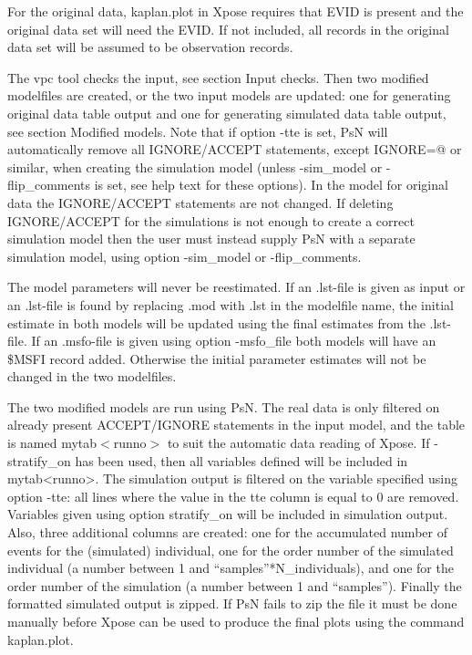 For the original data, kaplan.plot in Xpose requires that EVID is present and the original data set will need the EVID. If not included, all records in the original data set will be assumed to be observation records.

The vpc tool checks the input, see section Input checks. Then two modified modelfiles are created, or the two input models are updated: one for generating original data table output and one for generating simulated data table output, see section Modified models. Note that if option -tte is set, PsN will automatically remove all  IGNORE/ACCEPT statements, except IGNORE=@ or similar,  when creating the simulation model (unless -sim\_model or -flip\_comments is set, see help text for these options). In the model for original data the IGNORE/ACCEPT statements are not changed. If deleting IGNORE/ACCEPT for the simulations is not enough to create a correct simulation model then the user must instead supply PsN with a separate simulation model, using option -sim\_model or -flip\_comments.

The model parameters will never be reestimated. If an .lst-file is given as input or an .lst-file is found by replacing .mod with .lst in the modelfile name, the initial estimate in both models will be updated using the final estimates from the .lst-file. If an .msfo-file is given using option -msfo\_file both models will have an \$MSFI record added. Otherwise the initial parameter estimates will not be changed in the two modelfiles. 

The two modified models are run using PsN. The real data is only filtered on already present ACCEPT/IGNORE statements in the input model, and the table is named mytab$<$runno$>$ to suit the automatic data reading of Xpose. If -stratify\_on has been used, then all variables defined will be included in mytab<runno>. The simulation output is filtered on the variable specified using option -tte: all lines where the value in the tte column is equal to 0 are removed. Variables given using option stratify\_on will be included in simulation output. Also, three additional columns are created: one for the accumulated number of events for the (simulated) individual, one for the order number of the simulated individual (a number between 1 and “samples”*N\_individuals), and one for the order number of the simulation (a number between 1 and “samples”).  Finally the formatted simulated output is zipped. If PsN fails to zip the file it must be done manually before Xpose can be used to produce the final plots using the command kaplan.plot.

